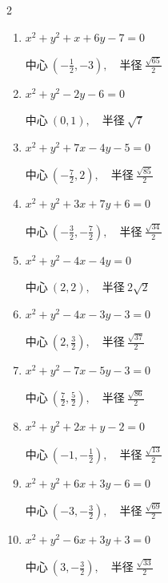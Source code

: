 \begin{multicols}{2}
\begin{enumerate}
        $\displaystyle 中心\: \left(-3,\frac{1}{2}\right), \quad 半径 \ \frac{3}{2}$

  \item $x^{2}+y^{2}+x+6y-7=0$

        $\displaystyle 中心\: \left(-\frac{1}{2},-3\right), \quad 半径 \ \frac{\sqrt{65}}{2}$

\columnbreak %

  \item $x^{2}+y^{2}-2y-6=0$

        $\displaystyle 中心\: \left(0,1\right), \quad 半径 \ \sqrt{7}$

  \item $x^{2}+y^{2}+7x-4y-5=0$

        $\displaystyle 中心\: \left(-\frac{7}{2},2\right), \quad 半径 \ \frac{\sqrt{85}}{2}$

  \item $x^{2}+y^{2}+3x+7y+6=0$

        $\displaystyle 中心\: \left(-\frac{3}{2},-\frac{7}{2}\right), \quad 半径 \ \frac{\sqrt{34}}{2}$

  \item $x^{2}+y^{2}-4x-4y=0$

        $\displaystyle 中心\: \left(2,2\right), \quad 半径 \ 2\sqrt{2}$

  \item $x^{2}+y^{2}-4x-3y-3=0$

        $\displaystyle 中心\: \left(2,\frac{3}{2}\right), \quad 半径 \ \frac{\sqrt{37}}{2}$

  \item $x^{2}+y^{2}-7x-5y-3=0$

        $\displaystyle 中心\: \left(\frac{7}{2},\frac{5}{2}\right), \quad 半径 \ \frac{\sqrt{86}}{2}$

  \item $x^{2}+y^{2}+2x+y-2=0$

        $\displaystyle 中心\: \left(-1,-\frac{1}{2}\right), \quad 半径 \ \frac{\sqrt{13}}{2}$

  \item $x^{2}+y^{2}+6x+3y-6=0$

        $\displaystyle 中心\: \left(-3,-\frac{3}{2}\right), \quad 半径 \ \frac{\sqrt{69}}{2}$

  \item $x^{2}+y^{2}-6x+3y+3=0$

        $\displaystyle 中心\: \left(3,-\frac{3}{2}\right), \quad 半径 \ \frac{\sqrt{33}}{2}$


\end{enumerate}
\end{multicols}
